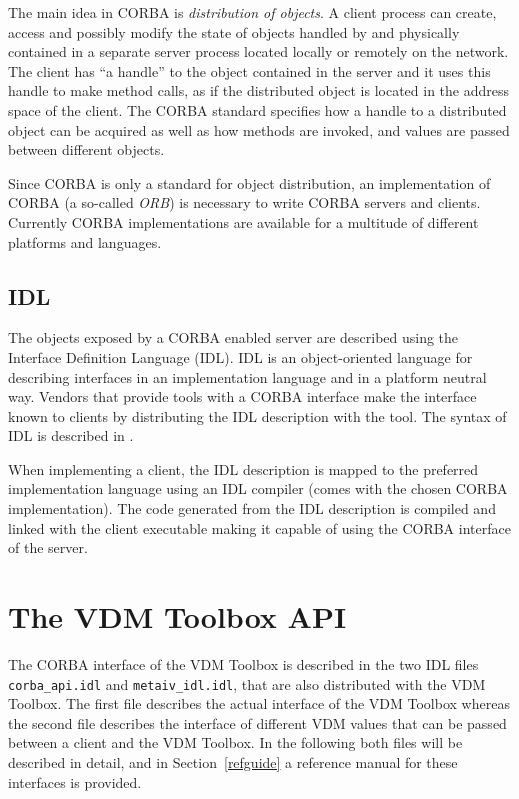 \documentclass[\pformat,12pt]{article}
\begin{document}
The main idea in CORBA is {\em distribution of objects}. A client
process can create, access and possibly modify the state of objects
handled by and physically contained in a separate server process
located locally or remotely on the network. The client has ``a
handle'' to the object contained in the server and it uses this handle
to make method calls, as if the distributed object is located in the
address space of the client. The CORBA standard specifies how a handle
to a distributed object can be acquired as well as how methods are
invoked, and values are passed between different objects. 

Since CORBA is only a standard for object distribution, an
implementation of CORBA (a so-called {\em ORB}) is necessary to write
CORBA servers and clients. Currently CORBA implementations are
available for a multitude of different platforms and languages.  

\subsection{IDL}

The objects exposed by a CORBA enabled server are described using the
Interface Definition Language (IDL). IDL is an object-oriented
language for describing interfaces in an implementation language and
in a platform neutral way. Vendors that provide tools with a CORBA
interface make the interface known to clients by distributing the IDL
description with the tool. The syntax of IDL is described in
\cite{OMG&96}. 

When implementing a client, the IDL description is mapped to the
preferred implementation language using an IDL compiler (comes with
the chosen CORBA implementation). The code generated from the IDL
description is compiled and linked with the client executable making
it capable of using the CORBA interface of the server. 

\newpage
\section{The VDM Toolbox API} 
\label{Toolboxapi}

The CORBA interface of the VDM Toolbox is described in the two IDL
files {\tt corba\_api.idl} and {\tt metaiv\_idl.idl}, that are also
distributed with the VDM Toolbox. The first file describes the actual
interface of the VDM Toolbox whereas the second file describes the
interface of different VDM values that can be passed between a client
and the VDM Toolbox. In the following both files will be described in
detail, and in Section~\ref{refguide} a reference manual for these 
interfaces is provided. 
\end{document}
